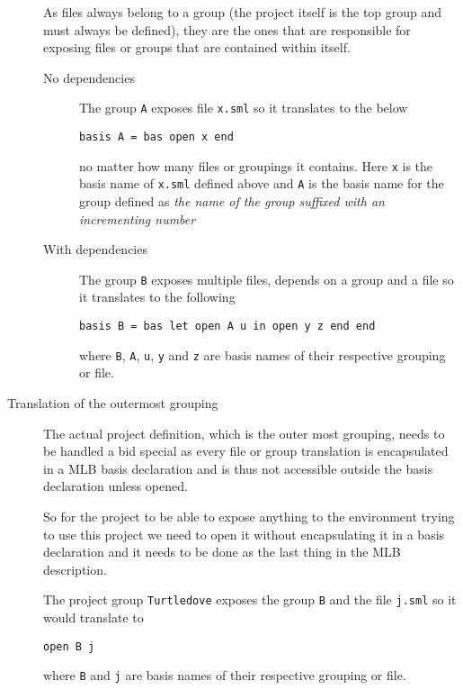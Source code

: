 \begin{description}
  As files always belong to a group (the project itself is the top group and
  must always be defined), they are the ones that are responsible for exposing
  files or groups that are contained within itself.
  
  \begin{description}
  \item[No dependencies]
    
    The group \texttt{A} exposes file \texttt{x.sml} so it translates to the
    below
    
\begin{lstlisting}
basis A = bas open x end
\end{lstlisting}
    
    no matter how many files or groupings it contains. Here \texttt{x} is the
    basis name of \texttt{x.sml} defined above and \texttt{A} is the basis name
    for the group defined as \textit{the name of the group suffixed with an
      incrementing number}
    
  \item[With dependencies] The group \texttt{B} exposes multiple files, depends
    on a group and a file so it translates to the following
    
\begin{lstlisting}
basis B = bas let open A u in open y z end end
\end{lstlisting}
    
    where \texttt{B}, \texttt{A}, \texttt{u}, \texttt{y} and \texttt{z} are
    basis names of their respective grouping or file.
  \end{description}
  
  
\item[Translation of the outermost grouping]
  
  The actual project definition, which is the outer most grouping, needs to be
  handled a bid special as every file or group translation is encapsulated in a
  MLB basis declaration and is thus not accessible outside the basis declaration
  unless opened.
  
  So for the project to be able to expose anything to the environment trying to
  use this project we need to open it without encapsulating it in a basis
  declaration and it needs to be done as the last thing in the MLB description.
  
  The project group \texttt{Turtledove} exposes the group \texttt{B} and the
  file \texttt{j.sml} so it would translate to
  
\begin{lstlisting}
open B j
\end{lstlisting}
  
  where \texttt{B} and \texttt{j} are basis names of their respective grouping
  or file.
  
\end{description}



